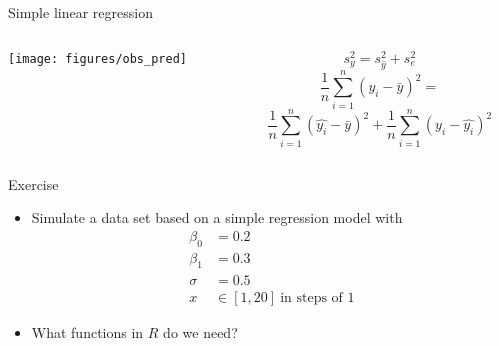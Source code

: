\documentclass{beamer}
\begin{document}
\begin{frame}{Simple linear regression}
\begin{columns}[c]
\begin{column}{6cm}
  \texttt{[image: figures/obs\_pred]}
\end{column}
%
\begin{column}{5cm}
{\small
\[
  s_y^2 = s_{\hat y}^2 + s_e^2
\]
\[
  \frac{1}{n} \sum_{i=1}^n (y_i - \bar{y})^2 =
\]
\[
  \frac{1}{n} \sum_{i=1}^n (\hat{y_i} - \bar{y})^2 +
  \frac{1}{n} \sum_{i=1}^n (y_i - \hat{y_i})^2
\]
}
\end{column}
\end{columns}
\vfill
\end{frame}

\begin{frame}{}
  \begin{block}{Exercise}
    \begin{itemize}
      \item Simulate a data set based on a simple regression model with
        \begin{align*}
          \beta_0 & = 0.2\\
          \beta_1 & = 0.3\\
          \sigma & = 0.5\\
          x & \in [1, 20]~\text{in steps of 1}
        \end{align*}
        \vspace{-.5cm}
      \item What functions in $R$ do we need?
    \end{itemize}
  \end{block}
\end{frame}
\end{document}
